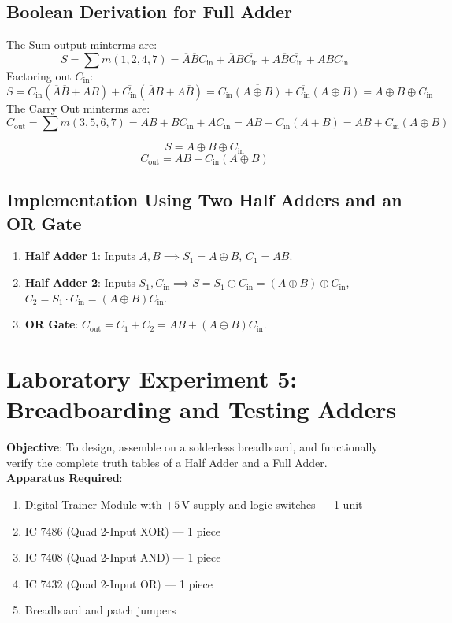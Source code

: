 \subsection{Boolean Derivation for Full Adder}
The Sum output minterms are:
\[ S = \sum m(1, 2, 4, 7) = \overline{A}\overline{B}C_{\mathrm{in}} + \overline{A}B\overline{C_{\mathrm{in}}} + A\overline{B}\overline{C_{\mathrm{in}}} + ABC_{\mathrm{in}} \]
Factoring out $C_{\mathrm{in}}$:
\[ S = C_{\mathrm{in}}(\overline{A}\overline{B} + AB) + \overline{C_{\mathrm{in}}}(\overline{A}B + A\overline{B}) = C_{\mathrm{in}}\overline{(A \oplus B)} + \overline{C_{\mathrm{in}}}(A \oplus B) = A \oplus B \oplus C_{\mathrm{in}} \]
The Carry Out minterms are:
\[ C_{\mathrm{out}} = \sum m(3, 5, 6, 7) = AB + BC_{\mathrm{in}} + AC_{\mathrm{in}} = AB + C_{\mathrm{in}}(A + B) = AB + C_{\mathrm{in}}(A \oplus B) \]

\begin{keyequation}
\[ S = A \oplus B \oplus C_{\mathrm{in}} \]
\[ C_{\mathrm{out}} = AB + C_{\mathrm{in}}(A \oplus B) \]
\end{keyequation}

\subsection{Implementation Using Two Half Adders and an OR Gate}
\begin{enumerate}
    \item \textbf{Half Adder 1}: Inputs $A, B \implies S_1 = A \oplus B$, $C_1 = AB$.
    \item \textbf{Half Adder 2}: Inputs $S_1, C_{\mathrm{in}} \implies S = S_1 \oplus C_{\mathrm{in}} = (A \oplus B) \oplus C_{\mathrm{in}}$, $C_2 = S_1 \cdot C_{\mathrm{in}} = (A \oplus B)C_{\mathrm{in}}$.
    \item \textbf{OR Gate}: $C_{\mathrm{out}} = C_1 + C_2 = AB + (A \oplus B)C_{\mathrm{in}}$.
\end{enumerate}

\section{Laboratory Experiment 5: Breadboarding and Testing Adders}
\begin{experimentbox}
\textbf{Objective}: To design, assemble on a solderless breadboard, and functionally verify the complete truth tables of a Half Adder and a Full Adder.\\
\textbf{Apparatus Required}:
\begin{enumerate}
    \item Digital Trainer Module with $+5\,\mathrm{V}$ supply and logic switches --- 1 unit
    \item IC 7486 (Quad 2-Input XOR) --- 1 piece
    \item IC 7408 (Quad 2-Input AND) --- 1 piece
    \item IC 7432 (Quad 2-Input OR) --- 1 piece
    \item Breadboard and patch jumpers
\end{enumerate}
\end{experimentbox}


